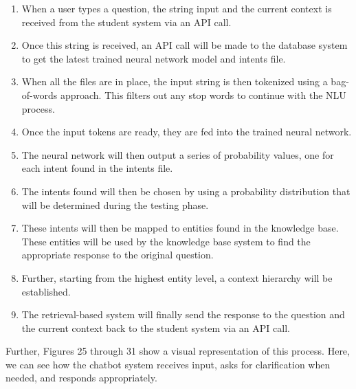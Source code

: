 \documentclass[titlepage, 12pt]{article}
\begin{document}
\begin{enumerate}
    \item When a user types a question, the string input and the current context is received from the student system via an API call.
    \item Once this string is received, an API call will be made to the database system to get the latest trained neural network model and intents file.
    \item When all the files are in place, the input string is then tokenized using a bag-of-words approach. This filters out any stop words to continue with the NLU process.
    \item Once the input tokens are ready, they are fed into the trained neural network.
    \item The neural network will then output a series of probability values, one for each intent found in the intents file.
    \item The intents found will then be chosen by using a probability distribution that will be determined during the testing phase.
    \item These intents will then be mapped to entities found in the knowledge base. These entities will be used by the knowledge base system to find the appropriate response to the original question.
    \item Further, starting from the highest entity level, a context hierarchy will be established.
    \item The retrieval-based system will finally send the response to the question and the current context back to the student system via an API call.
\end{enumerate}

Further, Figures 25 through 31 show a visual representation of this process. Here, we can see how the chatbot system receives input, asks for clarification when needed, and responds appropriately.
\end{document}
